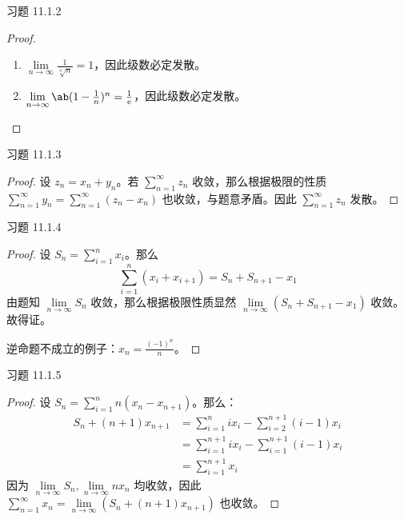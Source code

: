 \begin{problem}
    习题 11.1.2
    \begin{proof}
        \begin{enumerate}
            \item[\textbf{1)}] $\lim\limits_{n \to \infty} \frac{1}{\sqrt[n]{n}} = 1$，因此级数必定发散。
            \item[\textbf{3)}] $\lim\limits_{n \to \infty} \ab(1 - \frac{1}{n})^{n} = \frac{1}{\E}$，因此级数必定发散。
        \end{enumerate}
    \end{proof}
\end{problem}

\begin{problem}
    习题 11.1.3
    \begin{proof}
        设 $z_n = x_n + y_n$。若 $\sum\limits_{n = 1}^{\infty} z_n$ 收敛，那么根据极限的性质 $\sum\limits_{n = 1}^{\infty} y_n = \sum\limits_{n = 1}^{\infty} (z_n - x_n)$ 也收敛，与题意矛盾。因此 $\sum\limits_{n = 1}^{\infty} z_n$ 发散。
    \end{proof}
\end{problem}

\begin{problem}
    习题 11.1.4
    \begin{proof}
        设 $S_n = \sum\limits_{i = 1}^{n} x_i$。那么
        $$
        \sum_{i = 1}^n (x_i + x_{i + 1}) = S_n + S_{n + 1} - x_1
        $$
        由题知 $\lim\limits_{n \to \infty} S_n$ 收敛，那么根据极限性质显然 $\lim\limits_{n \to \infty} (S_n + S_{n + 1} - x_1)$ 收敛。故得证。

        逆命题不成立的例子：$x_n = \frac{(-1)^{n}}{n}$。
    \end{proof}
\end{problem}

\begin{problem}
    习题 11.1.5
    \begin{proof}
        设 $S_n = \sum\limits_{i = 1}^{n} n(x_n - x_{n + 1})$。那么：
        $$
        \begin{aligned}
            S_n + (n + 1) x_{n + 1} & = \sum_{i = 1}^{n} i x_i - \sum_{i = 2}^{n + 1} (i - 1) x_i \\
            & = \sum_{i = 1}^{n + 1} i x_i - \sum_{i = 1}^{n + 1} (i - 1) x_i \\
            & = \sum_{i = 1}^{n + 1} x_i
        \end{aligned}
        $$
        因为 $\lim\limits_{n \to \infty} S_n, \lim\limits_{n \to \infty} n x_n$ 均收敛，因此 $\sum\limits_{n = 1}^{\infty} x_n = \lim\limits_{n \to \infty} (S_n + (n + 1) x_{n + 1})$ 也收敛。
    \end{proof}
\end{problem}


